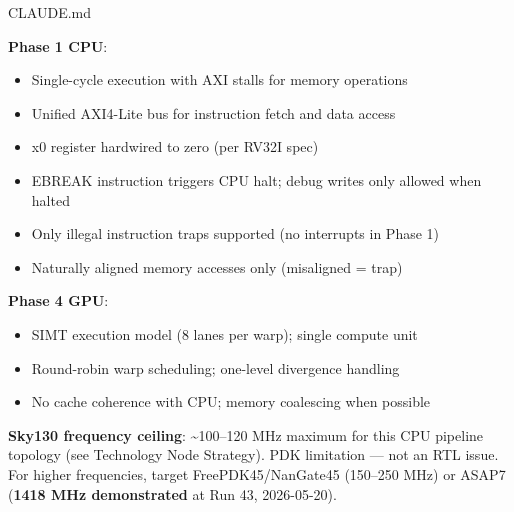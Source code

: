 \begin{relocated}{CLAUDE.md}

\textbf{Phase 1 CPU}:

\begin{itemize}
\tightlist
\item
  Single-cycle execution with AXI stalls for memory operations
\item
  Unified AXI4-Lite bus for instruction fetch and data access
\item
  x0 register hardwired to zero (per RV32I spec)
\item
  EBREAK instruction triggers CPU halt; debug writes only allowed when
  halted
\item
  Only illegal instruction traps supported (no interrupts in Phase 1)
\item
  Naturally aligned memory accesses only (misaligned = trap)
\end{itemize}

\textbf{Phase 4 GPU}:

\begin{itemize}
\tightlist
\item
  SIMT execution model (8 lanes per warp); single compute unit
\item
  Round-robin warp scheduling; one-level divergence handling
\item
  No cache coherence with CPU; memory coalescing when possible
\end{itemize}

\textbf{Sky130 frequency ceiling}: \textasciitilde100--120 MHz maximum
for this CPU pipeline topology (see Technology Node Strategy). PDK
limitation --- not an RTL issue. For higher frequencies, target
FreePDK45/\allowbreak{}NanGate45 (150--250 MHz) or ASAP7 (\textbf{1418
MHz demonstrated} at Run 43, 2026-05-20).
\end{relocated}


